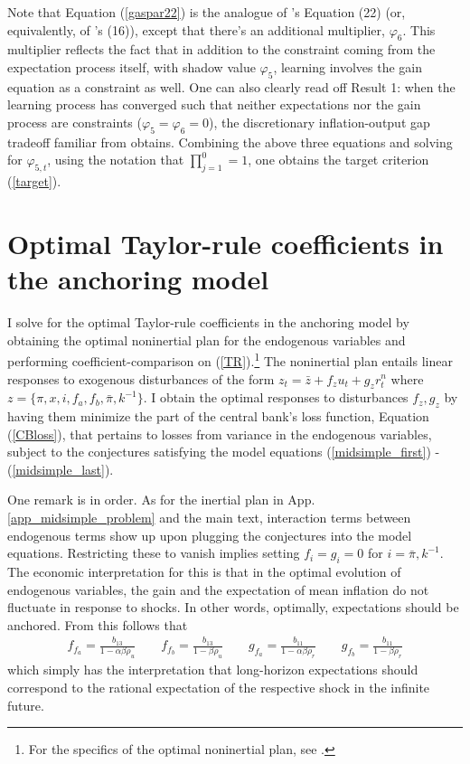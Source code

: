 \documentclass[11pt]{article}
\renewcommand{\[}{\begin{equation}}
\renewcommand{\]}{\end{equation}}
\begin{document}
Note that Equation (\ref{gaspar22}) is the analogue of \cite{gaspar2010inflation}'s Equation (22) (or, equivalently, of  \cite{molnar2014optimal}'s (16)), except that there's an additional multiplier, $\varphi_6$. This multiplier reflects the fact that in addition to the constraint coming from the expectation process itself, with shadow value $\varphi_5$, learning involves the gain equation as a constraint as well. One can also clearly read off Result 1: when the learning process has converged such that neither expectations nor the gain process are constraints ($\varphi_5 =\varphi_6 = 0$), the discretionary inflation-output gap tradeoff familiar from \cite{clarida1999science} obtains. Combining the above three equations and solving for $\varphi_{5,t}$, using the notation that $\prod_{j=1}^{0} = 1$, one obtains the target criterion (\ref{target}).

\section{Optimal Taylor-rule coefficients in the anchoring model} \label{app_oni}
I solve for the optimal Taylor-rule coefficients in the anchoring model by obtaining the optimal noninertial plan for the endogenous variables and performing coefficient-comparison on (\ref{TR}).\footnote{For the specifics of the optimal noninertial plan, see \cite{woodford2011interest}.} The noninertial plan entails linear responses to exogenous disturbances of the form $z_t = \bar{z} + f_z u_t + g_z r_t^n$ where $z = \{\pi,x,i, f_a, f_b, \bar{\pi}, k^{-1}\}$. I obtain the optimal responses to disturbances $f_z, g_z$ by having them minimize the part of the central bank's loss function, Equation (\ref{CBloss}), that pertains to losses from variance in the endogenous variables, subject to the conjectures satisfying the model equations (\ref{midsimple_first}) - (\ref{midsimple_last}). 

One remark is in order. As for the inertial plan in App. \ref{app_midsimple_problem} and the main text, interaction terms between endogenous terms show up upon plugging the conjectures into the model equations. Restricting these to vanish implies setting $f_i = g_i=0$ for $i = \bar{\pi}, k^{-1}$. The economic interpretation for this is that in the optimal evolution of endogenous variables, the gain and the expectation of mean inflation do not fluctuate in response to shocks. In other words, optimally, expectations should be anchored. From this follows that 
\begin{align}
f_{f_a} = \frac{b_{13}}{1-\alpha  \beta  \rho _u}\quad \quad  f_{f_b}=  \frac{b_{13}}{1-\beta  \rho _u} \quad \quad g_{f_a}  = \frac{b_{11}}{1-\alpha  \beta  \rho _r} \quad \quad g_{f_b} = \frac{b_{11}}{1-\beta  \rho _r}
\end{align}
which simply has the interpretation that long-horizon expectations should correspond to the rational expectation of the respective shock in the infinite future.
\end{document}

